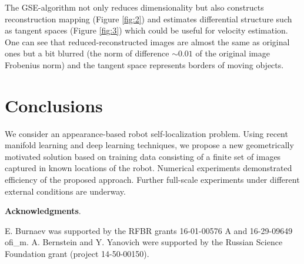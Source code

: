 \documentclass[conference]{IEEEtran} %
\begin{document}
The GSE-algorithm not only reduces dimensionality but also constructs reconstruction mapping (Figure \ref{fig:2}) and estimates differential structure such as tangent spaces (Figure \ref{fig:3}) which could be useful for velocity estimation. One can see that reduced-reconstructed images are almost the same as original ones but a bit blurred (the norm of difference $\sim 0.01$ of the original image Frobenius norm) and the tangent space represents borders of moving objects.

\section{Conclusions}
\label{sec6}

 We consider an appearance-based robot self-localization problem. Using recent manifold learning and deep learning techniques, we propose a new geometrically motivated solution based on training data consisting of a finite set of images captured in known locations of the robot. Numerical experiments demonstrated efficiency of the proposed approach. Further full-scale experiments under different external conditions are underway.

\vspace{1em}
\noindent\textbf{Acknowledgments}.

E. Burnaev was supported by the RFBR grants 16-01-00576 A and 16-29-09649 ofi\_m. A. Bernstein and Y. Yanovich were supported by the Russian Science Foundation grant (project 14-50-00150).
\end{document}
